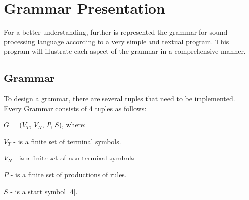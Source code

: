 \chapter{Grammar Presentation}
For a better understanding, further is represented the grammar for sound processing language according to a very simple and textual program. This program will illustrate each aspect of the grammar in a comprehensive manner. 

\section{Grammar}
To design a grammar, there are several tuples that need to be implemented. Every Grammar consists of 4 tuples as follows:

$G$ = ($V_T$, $V_N$, $P$, $S$), where:

$V_T$ - is a finite set of terminal symbols.

$V_N$ - is a finite set of non-terminal symbols.

$P$ - is a finite set of productions of rules. 

$S$ - is a start symbol [4].

